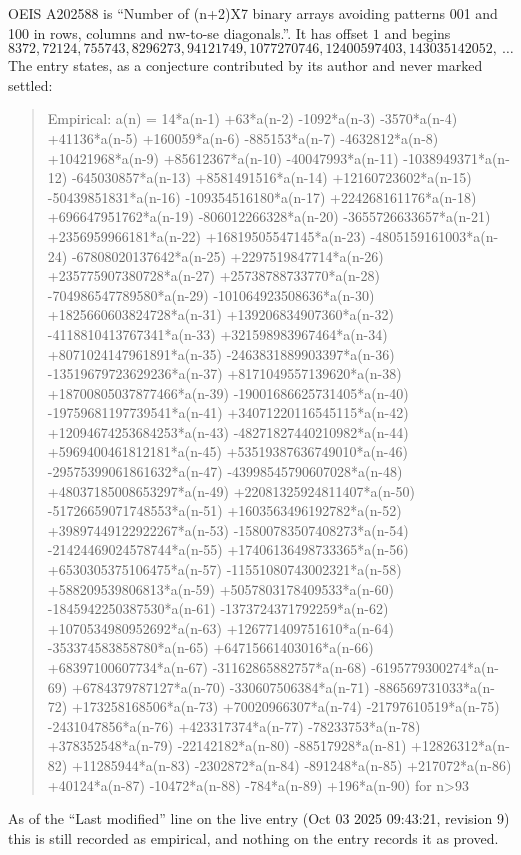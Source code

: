 \documentclass[11pt,a4paper]{article}
\theoremstyle{plain}
\theoremstyle{definition}
\begin{document}
OEIS A202588 is ``Number of (n+2)X7 binary arrays avoiding patterns 001 and 100 in rows, columns and nw-to-se diagonals.''. It has offset $1$ and begins
\[
8372, 72124, 755743, 8296273, 94121749, 1077270746, 12400597403, 143035142052,\ \dots
\]
The entry states, as a conjecture contributed by its author and never marked settled:
\begin{quote}
Empirical: a(n) = 14*a(n-1) +63*a(n-2) -1092*a(n-3) -3570*a(n-4) +41136*a(n-5) +160059*a(n-6) -885153*a(n-7) -4632812*a(n-8) +10421968*a(n-9) +85612367*a(n-10) -40047993*a(n-11) -1038949371*a(n-12) -645030857*a(n-13) +8581491516*a(n-14) +12160723602*a(n-15) -50439851831*a(n-16) -109354516180*a(n-17) +224268161176*a(n-18) +696647951762*a(n-19) -806012266328*a(n-20) -3655726633657*a(n-21) +2356959966181*a(n-22) +16819505547145*a(n-23) -4805159161003*a(n-24) -67808020137642*a(n-25) +2297519847714*a(n-26) +235775907380728*a(n-27) +25738788733770*a(n-28) -704986547789580*a(n-29) -101064923508636*a(n-30) +1825660603824728*a(n-31) +139206834907360*a(n-32) -4118810413767341*a(n-33) +321598983967464*a(n-34) +8071024147961891*a(n-35) -2463831889903397*a(n-36) -13519679723629236*a(n-37) +8171049557139620*a(n-38) +18700805037877466*a(n-39) -19001686625731405*a(n-40) -19759681197739541*a(n-41) +34071220116545115*a(n-42) +12094674253684253*a(n-43) -48271827440210982*a(n-44) +5969400461812181*a(n-45) +53519387636749010*a(n-46) -29575399061861632*a(n-47) -43998545790607028*a(n-48) +48037185008653297*a(n-49) +22081325924811407*a(n-50) -51726659071748553*a(n-51) +1603563496192782*a(n-52) +39897449122922267*a(n-53) -15800783507408273*a(n-54) -21424469024578744*a(n-55) +17406136498733365*a(n-56) +6530305375106475*a(n-57) -11551080743002321*a(n-58) +588209539806813*a(n-59) +5057803178409533*a(n-60) -1845942250387530*a(n-61) -1373724371792259*a(n-62) +1070534980952692*a(n-63) +126771409751610*a(n-64) -353374583858780*a(n-65) +64715661403016*a(n-66) +68397100607734*a(n-67) -31162865882757*a(n-68) -6195779300274*a(n-69) +6784379787127*a(n-70) -330607506384*a(n-71) -886569731033*a(n-72) +173258168506*a(n-73) +70020966307*a(n-74) -21797610519*a(n-75) -2431047856*a(n-76) +423317374*a(n-77) -78233753*a(n-78) +378352548*a(n-79) -22142182*a(n-80) -88517928*a(n-81) +12826312*a(n-82) +11285944*a(n-83) -2302872*a(n-84) -891248*a(n-85) +217072*a(n-86) +40124*a(n-87) -10472*a(n-88) -784*a(n-89) +196*a(n-90) for n>93
\end{quote}
As of the ``Last modified'' line on the live entry (Oct 03 2025 09:43:21, revision 9) this is still
recorded as empirical, and nothing on the entry records it as proved.
\end{document}
